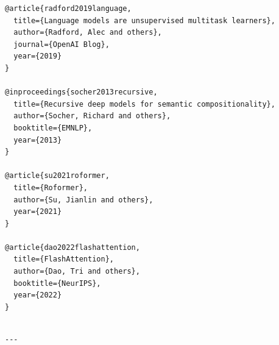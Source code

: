 \begin{lstlisting}
@article{radford2019language,
  title={Language models are unsupervised multitask learners},
  author={Radford, Alec and others},
  journal={OpenAI Blog},
  year={2019}
}

@inproceedings{socher2013recursive,
  title={Recursive deep models for semantic compositionality},
  author={Socher, Richard and others},
  booktitle={EMNLP},
  year={2013}
}

@article{su2021roformer,
  title={Roformer},
  author={Su, Jianlin and others},
  year={2021}
}

@article{dao2022flashattention,
  title={FlashAttention},
  author={Dao, Tri and others},
  booktitle={NeurIPS},
  year={2022}
}
\end{lstlisting}
\begin{lstlisting}

---
\end{lstlisting}